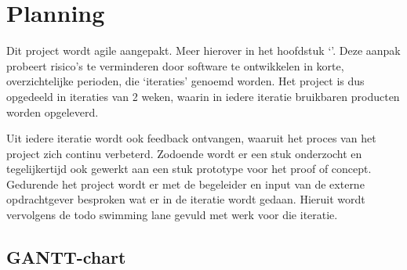 
\chapter{Planning}
Dit project wordt agile aangepakt. Meer hierover in het hoofdstuk ‘’. Deze aanpak probeert risico's te verminderen door software te ontwikkelen in korte, overzichtelijke perioden, die ‘iteraties’ genoemd worden. Het project is dus opgedeeld in iteraties van 2 weken, waarin in iedere iteratie bruikbaren producten worden opgeleverd.\par

Uit iedere iteratie wordt ook feedback ontvangen, waaruit het proces van het project zich continu verbeterd. Zodoende wordt er een stuk onderzocht en tegelijkertijd ook gewerkt aan een stuk prototype voor het proof of concept. Gedurende het project wordt er met de begeleider en input van de externe opdrachtgever besproken wat er in de iteratie wordt gedaan. Hieruit wordt vervolgens de todo swimming lane gevuld met werk voor die iteratie.

\section{GANTT-chart}

